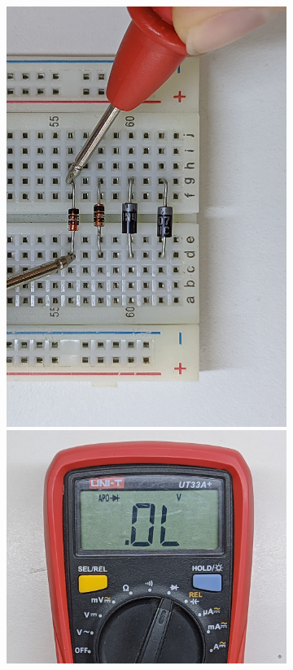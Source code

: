 \documentclass[chaptersright]{informeutn}
\begin{document}
\begin{figure}[!ht]
\begin{subfigure}[b]{1\textwidth}
\begin{minipage}[b]{0.24\textwidth}
        \end{minipage}
        \begin{minipage}[b]{0.24\textwidth}
          \centering
          \includegraphics[angle=-90, width=1\textwidth]{pictures/prot_diod-4i.jpg}
          \includegraphics[width=1\textwidth]{pictures/mult_diod-i.jpg}

\end{minipage}
\end{subfigure}
\end{figure}
\end{document}
